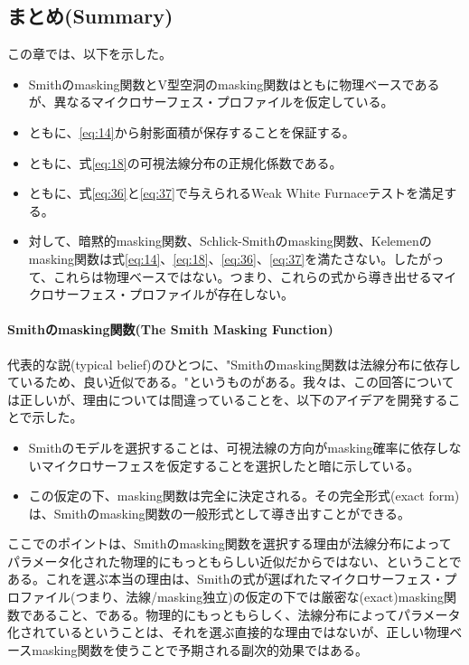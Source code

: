 \documentclass[a4j,xelatex,ja=standard]{bxjsarticle}
\begin{document}
\subsection{まとめ(Summary)}

この章では、以下を示した。

\begin{itemize}
    \item Smithのmasking関数とV型空洞のmasking関数はともに物理ベースであるが、異なるマイクロサーフェス・プロファイルを仮定している。
    \item ともに、\eqref{eq:14}から射影面積が保存することを保証する。
    \item ともに、式\eqref{eq:18}の可視法線分布の正規化係数である。
    \item ともに、式\eqref{eq:36}と\eqref{eq:37}で与えられるWeak White Furnaceテストを満足する。
    \item 対して、暗黙的masking関数、Schlick-Smithのmasking関数、Kelemenのmasking関数は式\eqref{eq:14}、\eqref{eq:18}、\eqref{eq:36}、\eqref{eq:37}を満たさない。したがって、これらは物理ベースではない。つまり、これらの式から導き出せるマイクロサーフェス・プロファイルが存在しない。
\end{itemize}

\paragraph{Smithのmasking関数(The Smith Masking Function)}

代表的な説(typical belief)のひとつに、"Smithのmasking関数は法線分布に依存しているため、良い近似である。"というものがある。我々は、この回答については正しいが、理由については間違っていることを、以下のアイデアを開発することで示した。

\begin{itemize}
    \item Smithのモデルを選択することは、可視法線の方向がmasking確率に依存しないマイクロサーフェスを仮定することを選択したと暗に示している。
    \item この仮定の下、masking関数は完全に決定される。その完全形式(exact form)は、Smithのmasking関数の一般形式として導き出すことができる。
\end{itemize}

ここでのポイントは、Smithのmasking関数を選択する理由が法線分布によってパラメータ化された物理的にもっともらしい近似だからではない、ということである。これを選ぶ本当の理由は、Smithの式が選ばれたマイクロサーフェス・プロファイル(つまり、法線/masking独立)の仮定の下では厳密な(exact)masking関数であること、である。物理的にもっともらしく、法線分布によってパラメータ化されているということは、それを選ぶ直接的な理由ではないが、正しい物理ベースmasking関数を使うことで予期される副次的効果ではある。
\end{document}
